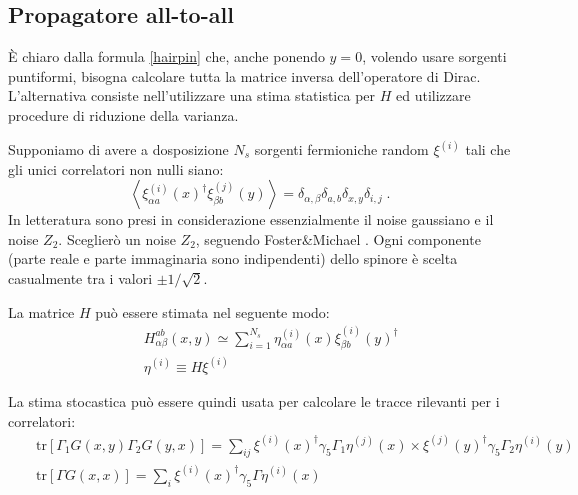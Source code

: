 \documentclass[a4paper]{article}
\newcommand{\tr}{\mathrm{tr}}
\newcommand{\point}{\; .}
\begin{document}
\subsection{Propagatore all-to-all}

\`{E} chiaro dalla formula \ref{hairpin} che, anche ponendo $y=0$, volendo usare sorgenti puntiformi, bisogna calcolare tutta la matrice inversa dell'operatore di Dirac. L'alternativa consiste nell'utilizzare una stima statistica per $H$ ed utilizzare procedure di riduzione della varianza.

Supponiamo di avere a dosposizione $N_s$ sorgenti fermioniche random $\xi^{(i)}$ tali che gli unici correlatori non nulli siano:
$$ \left< \xi^{(i)}_{\alpha a}(x)^\dagger \xi^{(j)}_{\beta b}(y) \right> = \delta_{\alpha,\beta} \delta_{a,b} \delta_{x,y} \delta_{i,j} \point $$
In letteratura sono presi in considerazione essenzialmente il noise gaussiano e il noise $Z_2$. Sceglier\`{o} un noise $Z_2$, seguendo Foster\&Michael \cite{Foster:1998vw}. Ogni componente (parte reale e parte immaginaria sono indipendenti) dello spinore \`{e} scelta casualmente tra i valori $\pm 1/\sqrt{2}$. 


La matrice $H$ pu\`{o} essere stimata nel seguente modo:
\begin{eqnarray}
&& H_{\alpha \beta}^{a b}(x,y) \simeq \sum_{i=1}^{N_s} \eta^{(i)}_{\alpha a}(x) \xi^{(i)}_{\beta b}(y)^\dagger \label{naive_noisy_estimate} \\
&& \eta^{(i)} \equiv H \xi^{(i)} \nonumber
\end{eqnarray}

La stima stocastica pu\`{o} essere quindi usata per calcolare le tracce rilevanti per i correlatori:
\begin{eqnarray}
&& \tr \left[ \Gamma_1 G(x,y) \Gamma_2 G(y,x) \right] = \sum_{ij} \xi^{(i)}(x)^\dagger \gamma_5 \Gamma_1 \eta^{(j)}(x) \times \xi^{(j)}(y)^\dagger \gamma_5 \Gamma_2 \eta^{(i)}(y) \\
&& \tr \left[ \Gamma G(x,x) \right] = \sum_i \xi^{(i)}(x)^\dagger \gamma_5 \Gamma \eta^{(i)}(x)
\end{eqnarray}
\end{document}
